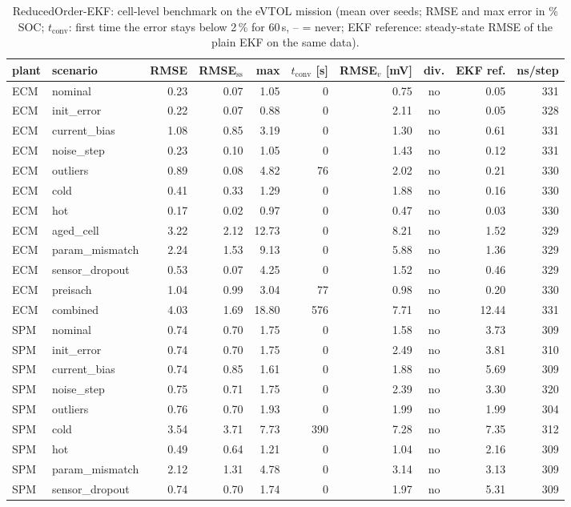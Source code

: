 \begin{table}[H]\centering\footnotesize\setlength{\tabcolsep}{4pt}
\caption{ReducedOrder-EKF: cell-level benchmark on the eVTOL mission (mean over seeds; RMSE and max error in \% SOC; $t_\mathrm{conv}$: first time the error stays below 2\,\% for 60\,s, -- = never; EKF reference: steady-state RMSE of the plain EKF on the same data).}\label{tab:cell_ReducedOrderEKF}
\begin{tabular}{llrrrrrcrr}\toprule
plant & scenario & RMSE & RMSE$_\mathrm{ss}$ & max & $t_\mathrm{conv}$ [s] & RMSE$_v$ [mV] & div. & EKF ref. & ns/step \\ \midrule
ECM & nominal & 0.23 & 0.07 & 1.05 & 0 & 0.75 & no & 0.05 & 331 \\
ECM & init\_error & 0.22 & 0.07 & 0.88 & 0 & 2.11 & no & 0.05 & 328 \\
ECM & current\_bias & 1.08 & 0.85 & 3.19 & 0 & 1.30 & no & 0.61 & 331 \\
ECM & noise\_step & 0.23 & 0.10 & 1.05 & 0 & 1.43 & no & 0.12 & 331 \\
ECM & outliers & 0.89 & 0.08 & 4.82 & 76 & 2.02 & no & 0.21 & 330 \\
ECM & cold & 0.41 & 0.33 & 1.29 & 0 & 1.88 & no & 0.16 & 330 \\
ECM & hot & 0.17 & 0.02 & 0.97 & 0 & 0.47 & no & 0.03 & 330 \\
ECM & aged\_cell & 3.22 & 2.12 & 12.73 & 0 & 8.21 & no & 1.52 & 329 \\
ECM & param\_mismatch & 2.24 & 1.53 & 9.13 & 0 & 5.88 & no & 1.36 & 329 \\
ECM & sensor\_dropout & 0.53 & 0.07 & 4.25 & 0 & 1.52 & no & 0.46 & 329 \\
ECM & preisach & 1.04 & 0.99 & 3.04 & 77 & 0.98 & no & 0.20 & 330 \\
ECM & combined & 4.03 & 1.69 & 18.80 & 576 & 7.71 & no & 12.44 & 331 \\
\midrule
SPM & nominal & 0.74 & 0.70 & 1.75 & 0 & 1.58 & no & 3.73 & 309 \\
SPM & init\_error & 0.74 & 0.70 & 1.75 & 0 & 2.49 & no & 3.81 & 310 \\
SPM & current\_bias & 0.74 & 0.85 & 1.61 & 0 & 1.88 & no & 5.69 & 309 \\
SPM & noise\_step & 0.75 & 0.71 & 1.75 & 0 & 2.39 & no & 3.30 & 320 \\
SPM & outliers & 0.76 & 0.70 & 1.93 & 0 & 1.99 & no & 1.99 & 304 \\
SPM & cold & 3.54 & 3.71 & 7.73 & 390 & 7.28 & no & 7.35 & 312 \\
SPM & hot & 0.49 & 0.64 & 1.21 & 0 & 1.04 & no & 2.16 & 309 \\
SPM & param\_mismatch & 2.12 & 1.31 & 4.78 & 0 & 3.14 & no & 3.13 & 309 \\
SPM & sensor\_dropout & 0.74 & 0.70 & 1.74 & 0 & 1.97 & no & 5.31 & 309 \\
\bottomrule\end{tabular}\end{table}
